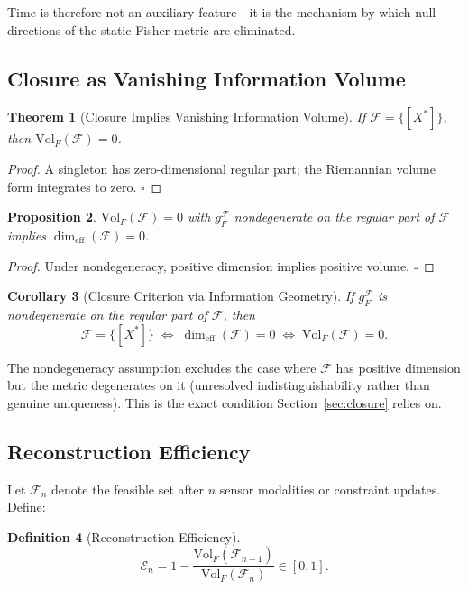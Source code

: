 \documentclass[12pt, oneside]{article}
\newtheorem{theorem}{Theorem}[section]
\newtheorem{proposition}[theorem]{Proposition}
\newtheorem{corollary}[theorem]{Corollary}
\newtheorem{definition}[theorem]{Definition}
\begin{document}
Time is therefore not an auxiliary feature---it is the mechanism by which null directions
of the static Fisher metric are eliminated.

\subsection{Closure as Vanishing Information Volume}

\begin{theorem}[Closure Implies Vanishing Information Volume]
\label{thm:closure_volume}
If $\mathcal{F} = \{[X^*]\}$, then $\mathrm{Vol}_F(\mathcal{F}) = 0$.
\end{theorem}
\begin{proof}
A singleton has zero-dimensional regular part; the Riemannian volume form integrates to
zero. $\square$
\end{proof}

\begin{proposition}
\label{prop:volume_converse}
$\mathrm{Vol}_F(\mathcal{F}) = 0$ with $g_F^{\mathcal{F}}$ nondegenerate on the regular
part of $\mathcal{F}$ implies $\dim_{\mathrm{eff}}(\mathcal{F}) = 0$.
\end{proposition}
\begin{proof}
Under nondegeneracy, positive dimension implies positive volume. $\square$
\end{proof}

\begin{corollary}[Closure Criterion via Information Geometry]
\label{cor:closure_criterion}
If $g_F^{\mathcal{F}}$ is nondegenerate on the regular part of $\mathcal{F}$, then
\[
\mathcal{F} = \{[X^*]\}
\;\Longleftrightarrow\;
\dim_{\mathrm{eff}}(\mathcal{F}) = 0
\;\Longleftrightarrow\;
\mathrm{Vol}_F(\mathcal{F}) = 0.
\]
\end{corollary}

The nondegeneracy assumption excludes the case where $\mathcal{F}$ has positive dimension
but the metric degenerates on it (unresolved indistinguishability rather than genuine
uniqueness). This is the exact condition Section~\ref{sec:closure} relies on.

\subsection{Reconstruction Efficiency}

Let $\mathcal{F}_n$ denote the feasible set after $n$ sensor modalities or constraint
updates. Define:

\begin{definition}[Reconstruction Efficiency]
\[
\mathcal{E}_n = 1 - \frac{\mathrm{Vol}_F(\mathcal{F}_{n+1})}{\mathrm{Vol}_F(\mathcal{F}_n)}
\in [0,1].
\]
\end{definition}
\end{document}
